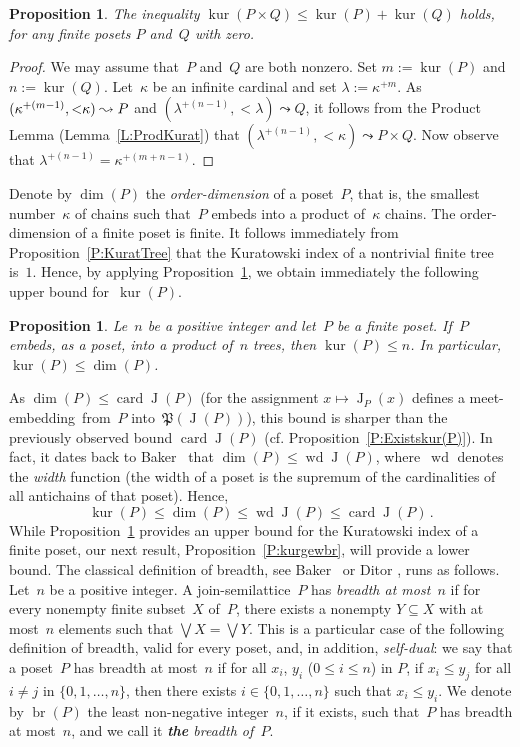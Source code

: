 \documentclass[psamsfonts,reqno]{amsart}
\theoremstyle{plain}
\newtheorem{proposition}[lemma]{Proposition}
\theoremstyle{definition}
\theoremstyle{remark}
\numberwithin{equation}{section}
\numberwithin{figure}{section}
\newcommand{\pup}[1]{\textup{(}{#1}\textup{)}}
\newcommand{\gk}{\kappa}
\newcommand{\gl}{\lambda}
\DeclareMathOperator{\kur}{kur}
\DeclareMathOperator{\brd}{br}
\DeclareMathOperator{\wdt}{wd}
\DeclareMathOperator{\card}{card}
\DeclareMathOperator{\J}{J}
\newcommand{\Pow}{\mathfrak{P}}
\newcommand{\memb}{meet-em\-bed\-ding}
\newcommand{\set}[1]{\{#1\}}
\newcommand{\js}{join-sem\-i\-lat\-tice}
\begin{document}
\begin{proposition}\label{P:AddKur}
The inequality $\kur(P\times Q)\leq\kur(P)+\kur(Q)$ holds, for any finite posets $P$ and~$Q$ with zero.
\end{proposition}

\begin{proof}
We may assume that~$P$ and~$Q$ are both nonzero. Set $m:=\kur(P)$ and $n:=\kur(Q)$. Let~$\gk$ be an infinite  cardinal and set $\gl:=\gk^{+m}$. As $(\gk^{+(m-1)},{<}\gk)\leadsto\nobreak P$ and $(\gl^{+(n-1)},{<}\gl)\leadsto Q$, it follows from the Product Lemma (Lemma~\ref{L:ProdKurat}) that $(\gl^{+(n-1)},{<}\gk)\leadsto P\times Q$. Now observe that $\gl^{+(n-1)}=\gk^{+(m+n-1)}$.
\end{proof}

Denote by $\dim(P)$ the \emph{order-dimension} of a poset~$P$, that is, the smallest number~$\gk$ of chains such that~$P$ embeds into a product of~$\gk$ chains. The order-dimension of a finite poset is finite. It follows immediately from Proposition~\ref{P:KuratTree} that the Kuratowski index of a nontrivial finite tree is~$1$. Hence, by applying Proposition~\ref{P:AddKur}, we obtain immediately the following upper bound for~$\kur(P)$.

\begin{proposition}\label{P:UppBd}
Le~$n$ be a positive integer and let~$P$ be a finite poset. If~$P$ embeds, as a poset, into a product of~$n$ trees, then $\kur(P)\leq n$. In particular, $\kur(P)\leq\dim(P)$.
\end{proposition}

As $\dim(P)\leq\card\J(P)$ (for the assignment $x\mapsto\J_P(x)$ defines a \memb\ from~$P$ into~$\Pow(\J(P))$), this bound is sharper than the previously observed bound $\card\J(P)$ (cf. Proposition~\ref{P:Existskur(P)}). In fact, it dates back to Baker~\cite{Baker} that $\dim(P)\leq\wdt\J(P)$, where~$\wdt$ denotes the \emph{width} function (the width of a poset is the supremum of the cardinalities of all antichains of that poset). Hence,
 \begin{equation}\label{Eq:VarIneqkurP}
 \kur(P)\leq\dim(P)\leq\wdt\J(P)\leq\card\J(P)\,.
 \end{equation}
While Proposition~\ref{P:UppBd} provides an upper bound for the Kuratowski index of a finite poset, our next result, Proposition~\ref{P:kurgewbr}, will provide a lower bound.
The classical definition of breadth, see Baker~\cite{Baker} or Ditor \cite[Section~4]{Dito84}, runs as follows. Let~$n$ be a positive integer. A \js\ $P$ has \emph{breadth at most~$n$} if for every nonempty finite subset~$X$ of~$P$, there exists a nonempty $Y\subseteq X$ with at most~$n$ elements such that $\bigvee X=\bigvee Y$. This is a particular case of the following definition of breadth, valid for every poset, and, in addition, \emph{self-dual}: we say that a poset~$P$ has breadth at most~$n$ if for all $x_i$, $y_i$ \pup{$0\leq i\leq n$} in $P$, if $x_i\leq y_j$ for all $i\neq j$ in $\set{0,1,\dots,n}$, then there exists $i\in\set{0,1,\dots,n}$ such that $x_i\leq y_i$. We denote by $\brd(P)$ the least non-negative integer~$n$, if it exists, such that~$P$ has breadth at most~$n$, and we call it \emph{\textbf{the} breadth of~$P$}.
\end{document}

